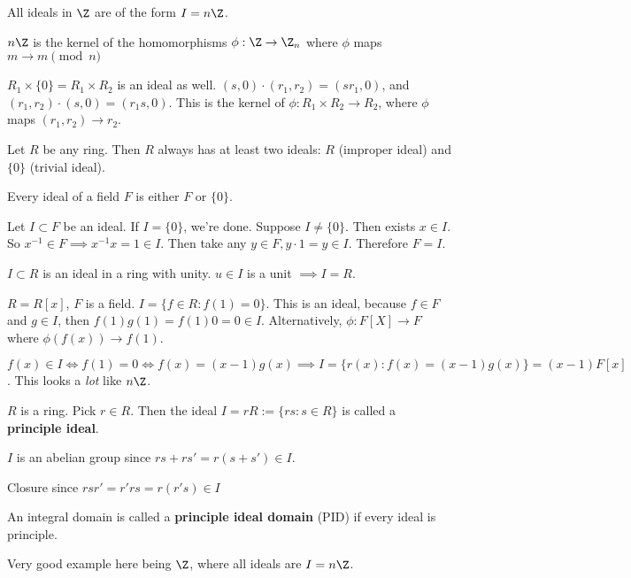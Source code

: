 \documentclass[10pt]{article}
\begin{document}
\begin{cor}
    All ideals in $\Z$ are of the form $I = n\Z$.
\end{cor}

$n\Z$ is the kernel of the homomorphisms $\phi: \Z \to \Z_n$ where $\phi$ maps $m \to m\pmod{n}$

\begin{exm*}
    $R_1 \times \{0\}= R_1 \times R_2$ is an ideal as well. $(s, 0)\cdot (r_1, r_2) = (sr_1, 0)$, and $(r_1, r_2)\cdot (s, 0) = (r_1s, 0)$. This is the kernel of $\phi: R_1 \times R_2 \to R_2$, where $\phi$ maps $(r_1, r_2) \to r_2$. 
\end{exm*}

Let $R$ be any ring. Then $R$ always has at least two ideals: $R$ (improper ideal) and $\{0\}$ (trivial ideal).

\begin{rmk}
    Every ideal of a field $F$ is either $F$ or $\{0\}$.
\end{rmk}
Let $I \subset F$ be an ideal. If $I = \{0\}$, we're done. Suppose $I \neq \{0\}$. Then exists $x\in I$. So $x^{-1} \in F \implies x^{-1}x = 1 \in I$. Then take any $y \in F, y \cdot 1 = y \in I$. Therefore $F = I$.

\begin{cor}
    $I \subset R$ is an ideal in a ring with unity. $u\in I$ is a unit $\implies I = R$.
\end{cor}

\begin{exm*}
    $R = R[x]$, $F$ is a field. $I = \{f \in R: f(1) = 0\}$. This is an ideal, because $f\in F$ and $g\in I$, then $f(1)g(1) = f(1)0 = 0 \in I$. Alternatively, $\phi: F[X] \to F$ where $\phi(f(x)) \to f(1)$.
\end{exm*}
$f(x) \in I \iff f(1) = 0 \iff f(x) = (x-1)g(x) \implies I = \{r(x) : f(x) = (x-1)g(x)\} = (x-1)F[x]$. This looks a \emph{lot} like $n\Z$. 

\begin{defn}
    $R$ is a ring. Pick $r \in R$. Then the ideal $I = rR := \{rs: s \in R\}$ is called a \textbf{principle ideal}.
\end{defn}

$I$ is an abelian group since $rs + rs' = r(s + s') \in I$.

Closure since $rsr' = r'rs = r(r's) \in I$

\begin{defn}
    An integral domain is called a \textbf{principle ideal domain} (PID) if every ideal is principle.
\end{defn}
Very good example here being $\Z$, where all ideals are $I = n\Z$.
\end{document}
